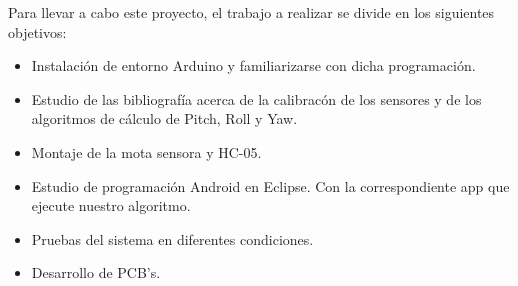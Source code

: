 		Para llevar a cabo este proyecto, el trabajo a realizar se divide en los siguientes objetivos:
		
		\begin{itemize}
			\item Instalaci\'on de entorno Arduino y familiarizarse con dicha programaci\'on.
			
			\item Estudio de las bibliograf\'ia acerca de la calibrac\'on de los sensores y de los algoritmos de c\'alculo de Pitch, Roll y Yaw.
			
			\item Montaje de la mota sensora y HC-05.
			
			\item Estudio de programaci\'on Android en Eclipse. Con la correspondiente app que ejecute nuestro algoritmo.
			
			\item Pruebas del sistema en diferentes condiciones.
			
			\item Desarrollo de PCB's.
		\end{itemize}
		
		
	\newpage
	$\ $